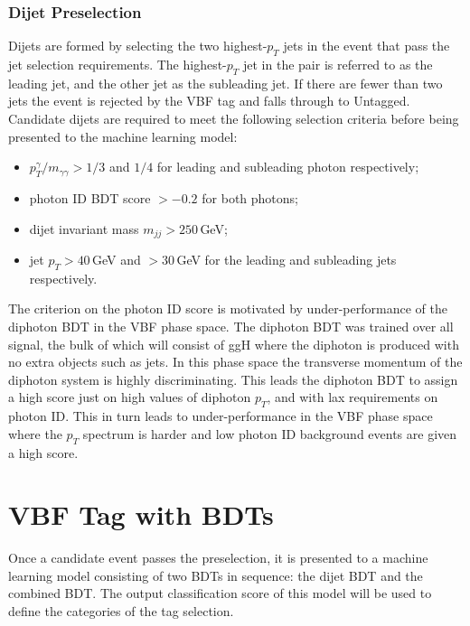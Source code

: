 \subsubsection{Dijet Preselection}
Dijets are formed by selecting the two highest-$p_T$ jets in the event that pass the jet selection requirements. The highest-$p_T$ jet in the pair is referred to as the leading jet, and the other jet as the subleading jet. If there are fewer than two jets the event is rejected by the VBF tag and falls through to Untagged. 
Candidate dijets are required to meet the following selection criteria before being presented to the machine learning model:
\begin{itemize}[noitemsep]
    \item $p^{\gamma}_{T}/m_{\gamma\gamma} > 1/3$ and $1/4$ for leading and subleading photon respectively;
    \item photon ID BDT score $> -0.2$ for both photons;
    \item dijet invariant mass $m_{jj} > 250$\,GeV;
    \item jet $p_{T} > 40$\,GeV and $> 30$\,GeV for the leading and subleading jets respectively.
\end{itemize}

The criterion on the photon ID score is motivated by under-performance of the diphoton BDT in the VBF phase space. 
The diphoton BDT was trained over all signal, the bulk of which will consist of ggH where the diphoton is produced with no extra objects such as jets. 
In this phase space the transverse momentum of the diphoton system is highly discriminating. 
This leads the diphoton BDT to assign a high score just on high values of diphoton $p_T$, and with lax requirements on photon ID. 
This in turn leads to under-performance in the VBF phase space where the $p_T$ spectrum is harder and low photon ID background events are given a high score. 








\section{VBF Tag with BDTs}
Once a candidate event passes the preselection, it is presented to a machine learning model consisting of two BDTs in sequence: the dijet BDT and the combined BDT. 
The output classification score of this model will be used to define the categories of the tag selection. 

